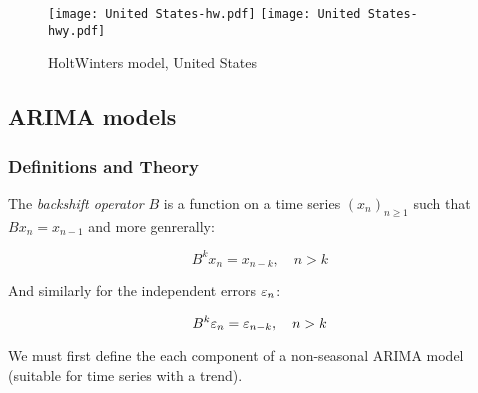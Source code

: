 \begin{figure}[H]
  \texttt{[image: United States-hw.pdf]} \label{fig:usa-hw}
\endminipage\hfill
{}
  \texttt{[image: United States-hwy.pdf]} \label{fig:usa-hwy}
\endminipage
\caption{HoltWinters model, United States}
\end{figure}


\subsection{ARIMA models}

\subsubsection{Definitions and Theory}

\begin{definition}
The \textit{backshift operator} $B$ is a function on a time series $\left(x_n\right)_{n\geq1}$ such that $Bx_n=x_{n-1}$ and more genrerally:

$$B^k x_n= x_{n-k},\quad n>k$$

And similarly for the independent errors $\varepsilon_n$:

$$B^k \varepsilon_n= \varepsilon_{n-k},\quad n>k$$
\end{definition}

We must first define the each component of a non-seasonal ARIMA model (suitable for time series with a trend).

